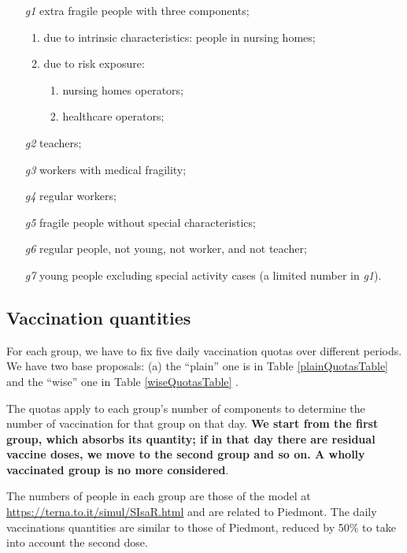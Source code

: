 \documentclass[graybox]{svmult}
\begin{document}
\begin{enumerate}[itemsep=-2pt]
\item [\emph{g1}]
	extra fragile people with three components;
	\begin{enumerate}[itemsep=-2pt]
		\item due to intrinsic characteristics: people in nursing homes;
		\item due to risk exposure:
		\begin{enumerate}[itemsep=-2pt]
			\item nursing homes operators;
			\item healthcare operators;
 		\end{enumerate} 
 	\end{enumerate}  
\item [\emph{g2}]
	teachers;
\item [\emph{g3}]
	workers with medical fragility;
\item [\emph{g4}]
	regular workers;
\item [\emph{g5}]
	fragile people without special characteristics;
\item [\emph{g6}]
	regular people, not young, not worker, and not teacher;
\item [\emph{g7}]
	young people excluding special activity cases (a limited number in \emph{g1}).
\end{enumerate}

\subsection{Vaccination quantities}\label{quantities}

For each group, we have to fix five daily vaccination quotas over different periods. We have two base proposals: (a) the ``plain'' one is in Table \ref{plainQuotasTable} and the ``wise'' one in Table \ref{wiseQuotasTable} . 

The quotas apply to each group's number of components to determine the number of vaccination for that group on that day. \textbf{We start from the first group, which absorbs its quantity; if in that day there are residual vaccine doses, we move to the second group and so on. A wholly vaccinated group is no more considered}.

The numbers of people in each group are those of the model at \url{https://terna.to.it/simul/SIsaR.html}  and are related to Piedmont. The daily vaccinations quantities are similar to those of Piedmont, reduced by 50\% to take into account the second dose.
 
\end{document}
